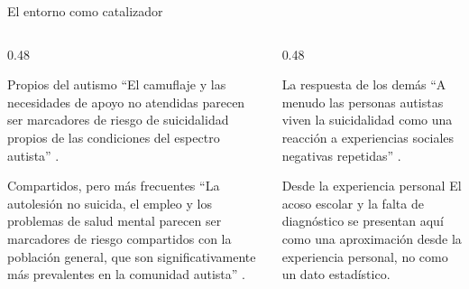 \begin{frame}{El entorno como catalizador}
  \begin{columns}[T,onlytextwidth]
    \begin{column}{0.48\textwidth}
      \begin{block}{Propios del autismo}
        \footnotesize
        \enquote{El camuflaje y las necesidades de apoyo no atendidas parecen
        ser marcadores de riesgo de suicidalidad propios de las condiciones del
        espectro autista} \citep{cassidy2018}.
      \end{block}
      \begin{block}{Compartidos, pero más frecuentes}
        \footnotesize
        \enquote{La autolesión no suicida, el empleo y los problemas de salud
        mental parecen ser marcadores de riesgo compartidos con la población
        general, que son significativamente más prevalentes en la comunidad
        autista} \citep{cassidy2018}.
      \end{block}
    \end{column}
    \begin{column}{0.48\textwidth}
      \begin{block}{La respuesta de los demás}
        \footnotesize
        \enquote{A menudo las personas autistas viven la suicidalidad como una
        reacción a experiencias sociales negativas repetidas}
        \citep{conner2023}.
      \end{block}
      \begin{alertblock}{Desde la experiencia personal}
        \footnotesize
        El acoso escolar y la falta de diagnóstico se presentan aquí como una
        aproximación desde la experiencia personal, no como un dato
        estadístico.
      \end{alertblock}
    \end{column}
  \end{columns}
\end{frame}


